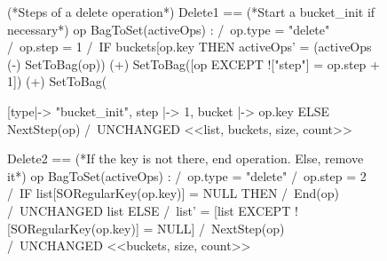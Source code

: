 \documentclass{uit-thesis}
\begin{document}
\begin{figure}
    \begin{tla}
        (*Steps of a delete operation*)
        Delete1 ==
            (*Start a bucket_init if necessary*)
            \E  op \in BagToSet(activeOps) :
                /\ op.type = "delete"
                /\ op.step = 1
                /\ IF buckets[op.key %
                        THEN activeOps' = (activeOps (-) SetToBag({op}))
                                                (+) SetToBag({[op EXCEPT !["step"] = op.step + 1]})
                                                (+) SetToBag({[type|-> "bucket_init", step |-> 1, bucket |-> op.key %
                        ELSE NextStep(op)
                /\ UNCHANGED <<list, buckets, size, count>>
        
        Delete2 ==
            (*If the key is not there, end operation. Else, remove it*)
            \E  op \in BagToSet(activeOps) :
                /\ op.type = "delete"
                /\ op.step = 2
                /\  IF list[SORegularKey(op.key)] = NULL
                        THEN /\ End(op)
                             /\ UNCHANGED list
                        ELSE /\ list' = [list EXCEPT ![SORegularKey(op.key)] = NULL]
                             /\ NextStep(op)
                /\ UNCHANGED <<buckets, size, count>>        
        
}
\end{tla}
\end{figure}
\end{document}

